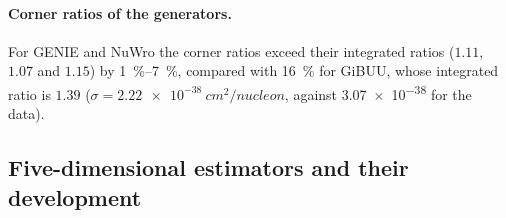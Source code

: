 \paragraph{Corner ratios of the generators.} For GENIE and NuWro the corner ratios exceed their integrated ratios ($1.11$, $1.07$ and $1.15$) by \SIrange{1}{7}{\percent}, compared with \SI{16}{\percent} for GiBUU, whose integrated ratio is $1.39$ ($\sigma=\SI{2.22e-38}{cm^2/nucleon}$, against \SI{3.07e-38}{} for the data).

\subsection{Five-dimensional estimators and their development}\label{recsec:higherdim-estimators}

